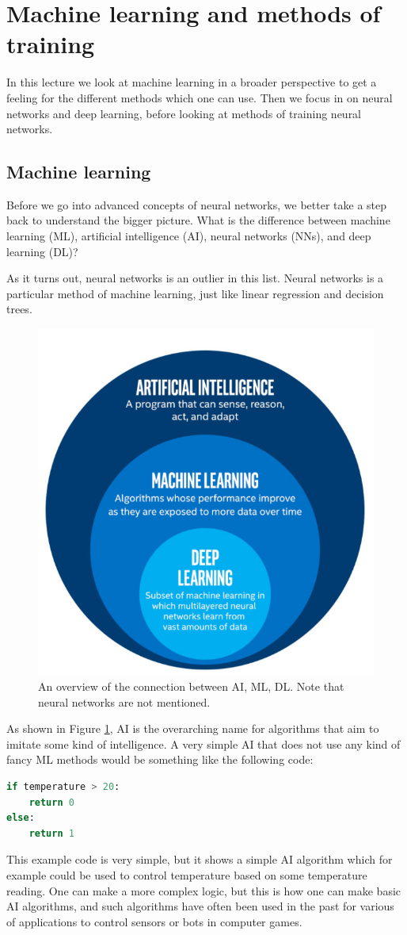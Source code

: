\documentclass[12pt,a4paper]{article} %
\numberwithin{equation}{section}
\begin{document}
\section{Machine learning and methods of training}
	In this lecture we look at machine learning in a broader perspective to get a feeling for the different methods which one can use. Then we focus in on neural networks and deep learning, before looking at methods of training neural networks.
	
	\subsection{Machine learning}
		Before we go into advanced concepts of neural networks, we better take a step back to understand the bigger picture. What is the difference between machine learning (ML), artificial intelligence (AI), neural networks (NNs), and deep learning (DL)?
		
		As it turns out, neural networks is an outlier in this list. Neural networks is a particular method of machine learning, just like linear regression and decision trees. 
		\begin{figure}
			\centering
			\includegraphics[width=0.7\linewidth]{figs/ai}
			\caption{An overview of the connection between AI, ML, DL. Note that neural networks are not mentioned.}
			\label{fig:ai}
		\end{figure}
		
		As shown in Figure \ref{fig:ai}, AI is the overarching name for algorithms that aim to imitate some kind of intelligence. A very simple AI that does not use any kind of fancy ML methods would be something like the following code:
		\begin{lstlisting}[language=Python]
if temperature > 20: 
	return 0
else:
	return 1
		\end{lstlisting}
		This example code is very simple, but it shows a simple AI algorithm which for example could be used to control temperature based on some temperature reading. One can make a more complex logic, but this is how one can make basic AI algorithms, and such algorithms have often been used in the past for various of applications to control sensors or bots in computer games.
		
\end{document}
